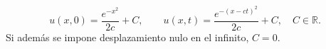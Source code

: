 \[u(x,0)=\frac{e^{-x^2}}{2c}+C,\qquad
u(x,t)=\frac{e^{-(x-ct)^2}}{2c}+C,\quad C\in\mathbb R.\]
Si además se impone desplazamiento nulo en el infinito, \(C=0\).
